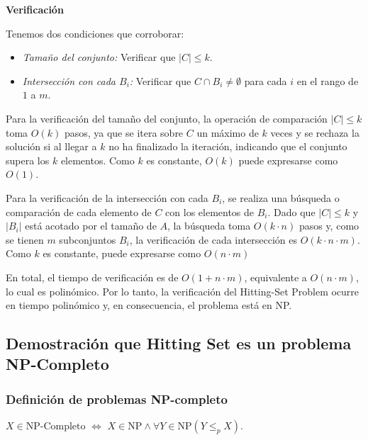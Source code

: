\documentclass{estilo}
\begin{document}
\textbf{Verificación}

\hspace{0.5cm} Tenemos dos condiciones que corroborar:


\begin{itemize}
    \item \textit{Tamaño del conjunto:} Verificar que $|C| \leq k$.
    \item \textit{Intersección con cada $B_i$:} Verificar que $C \cap B_i \neq \emptyset$ para cada $i$ en el rango de $1$ a $m$.
\end{itemize}

\hspace{0.5cm} Para la verificación del tamaño del conjunto, la operación de comparación $|C| \leq k$ toma $O(k)$ pasos, ya que se itera sobre $C$ un máximo de $k$ veces y se rechaza la solución si al llegar a $k$ no ha finalizado la iteración, indicando que el conjunto supera los $k$ elementos. Como $k$ es constante, $O(k)$ puede expresarse como $O(1)$.

\hspace{0.5cm} Para la verificación de la intersección con cada $B_i$, se realiza una búsqueda o comparación de cada elemento de $C$ con los elementos de $B_i$. Dado que $|C| \leq k$ y $|B_i|$ está acotado por el tamaño de $A$, la búsqueda toma $O(k \cdot n)$ pasos y, como se tienen $m$ subconjuntos $B_i$, la verificación de cada intersección es $O(k \cdot n \cdot m)$. Como $k$ es constante, puede expresarse como $O(n \cdot m)$

\hspace{0.5cm} En total, el tiempo de verificación es de $O(1 + n \cdot m)$, equivalente a $O(n \cdot m)$, lo cual es polinómico. Por lo tanto, la verificación del Hitting-Set Problem ocurre en tiempo polinómico y, en consecuencia, el problema está en NP.


\subsection{Demostración que Hitting Set es un problema NP-Completo}

\subsubsection{Definición de problemas NP-completo}

\hspace{0.5cm} \(X \in \text{NP-Completo}\) \(\Leftrightarrow\) \(X \in \text{NP} \land \forall Y \in \text{NP} (Y \leq_p X)\).
\end{document}
